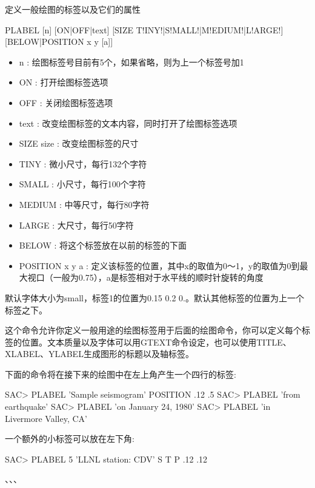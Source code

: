 \label{cmd:plabel}

定义一般绘图的标签以及它们的属性

\begin{SACSTX}
PLABEL [n] [ON|OFF|text] [SIZE T!INY!|S!MALL!|M!EDIUM!|L!ARGE!] [BELOW|POSITION x y [a]]
\end{SACSTX}

\begin{itemize}
\item n : 绘图标签号目前有5个，如果省略，则为上一个标签号加1
\item ON : 打开绘图标签选项 
\item OFF : 关闭绘图标签选项 
\item text : 改变绘图标签的文本内容，同时打开了绘图标签选项 
\item SIZE size :  改变绘图标签的尺寸 
\item TINY : 微小尺寸，每行132个字符 
\item SMALL :  小尺寸，每行100个字符 
\item MEDIUM : 中等尺寸，每行80字符 
\item LARGE : 大尺寸，每行50字符 
\item BELOW : 将这个标签放在以前的标签的下面 
\item POSITION x y a : 定义该标签的位置，其中x的取值为0～1，y的取值为0到最大视口（一般为0.75），a是标签相对于水平线的顺时针旋转的角度
\end{itemize}

默认字体大小为small，标签1的位置为0.15 0.2 0.。默认其他标签的位置为上一个标签之下。

这个命令允许你定义一般用途的绘图标签用于后面的绘图命令，你可以定义每个标签的位置。文本质量以及字体可以用GTEXT命令设定，也可以使用TITLE、XLABEL、YLABEL生成图形的标题以及轴标签。

下面的命令将在接下来的绘图中在左上角产生一个四行的标签:
\begin{SACCode}
SAC> PLABEL 'Sample seismogram' POSITION .12 .5
SAC> PLABEL 'from earthquake'
SAC> PLABEL 'on January 24, 1980'
SAC> PLABEL 'in Livermore Valley, CA'
\end{SACCode}

一个额外的小标签可以放在左下角:
\begin{SACCode}
SAC> PLABEL 5 'LLNL station: CDV' S T P .12 .12
\end{SACCode}

、、、
